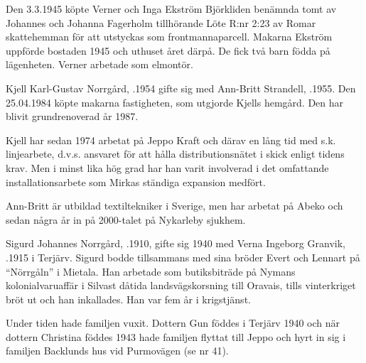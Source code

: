 %
Den 3.3.1945 köpte Verner och Inga Ekström Björkliden benämnda tomt av Johannes och Johanna Fagerholm tillhörande Löte R:nr 2:23 av Romar skattehemman för att utstyckas som frontmannaparcell. Makarna Ekström uppförde bostaden 1945 och uthuset året därpå. De fick två barn födda på lägenheten. Verner arbetade  som elmontör.



%



%
Kjell Karl-Gustav Norrgård, .1954 gifte sig  med Ann-Britt Strandell, .1955. Den 25.04.1984 köpte makarna fastigheten, som utgjorde Kjells hemgård. Den har blivit grundrenoverad år 1987.

Kjell har sedan 1974 arbetat på Jeppo Kraft och därav en lång tid med s.k. linjearbete, d.v.s. ansvaret för att hålla distributionsnätet i skick enligt tidens krav. Men i minst lika hög grad har han varit involverad i det omfattande installationsarbete som Mirkas ständiga expansion medfört.

Ann-Britt är utbildad textiltekniker i Sverige, men har arbetat på Abeko och sedan några år in på 2000-talet på Nykarleby sjukhem.
\begin{jhchildren}
  \item {}
  \item {}
\end{jhchildren}


%
Sigurd Johannes Norrgård, .1910, gifte sig 1940 med Verna Ingeborg Granvik, .1915 i Terjärv. Sigurd bodde tillsammans med sina bröder Evert och Lennart på ``Nörrgåln'' i Mietala. Han arbetade som butiksbiträde på Nymans kolonialvaruaffär i Silvast dåtida landsvägskorsning till Oravais, tills vinterkriget bröt ut och han inkallades. Han var fem år i krigstjänst.

Under tiden hade familjen vuxit. Dottern Gun föddes i Terjärv 1940 och när dottern Christina föddes 1943 hade familjen flyttat till Jeppo och hyrt in sig i familjen Backlunds hus vid Purmovägen (se nr 41).

